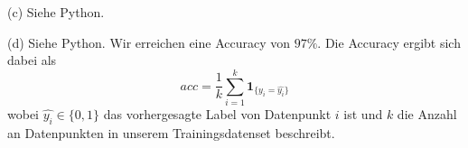 \documentclass[ngerman, a4paper,12pt]{article}
\begin{document}
\par
(c) Siehe Python. \par
(d) Siehe Python. Wir erreichen eine Accuracy von $97 \%$. Die Accuracy ergibt sich dabei als
\begin{equation}
	acc = \frac{1}{k} \sum_{i=1}^{k} \mathbf{1}_{ \{ y_i=\hat{y_i}\} }
\end{equation}
wobei $\hat{y_i} \in \{0, 1\}$ das vorhergesagte Label von Datenpunkt $i$ ist und $k$ die Anzahl an Datenpunkten in unserem Trainingsdatenset beschreibt.
\end{document}
